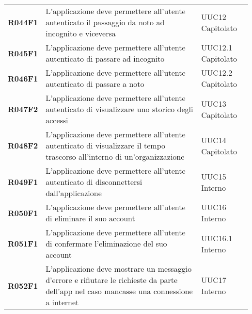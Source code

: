 \documentclass[../analisi-dei-requisiti.tex]{subfiles}
\begin{document}
\begin{longtable}[H]{>{\centering\bfseries}m{3cm} >{\centering}m{10cm} >{\centering\arraybackslash}m{3cm}}
  R044F1                               & L'applicazione deve permettere all'utente autenticato il passaggio da noto ad incognito e viceversa                                                                                                     & UUC12 Capitolato              \\
  R045F1                               & L'applicazione deve permettere all'utente autenticato di passare ad incognito                                                                                                                           & UUC12.1 Capitolato            \\
  R046F1                               & L'applicazione deve permettere all'utente autenticato di passare a noto                                                                                                                                 & UUC12.2 Capitolato            \\
  R047F2                               & L'applicazione deve permettere all'utente autenticato di visualizzare uno storico degli accessi                                                                                                         & UUC13 Capitolato              \\
  R048F2                               & L'applicazione deve permettere all'utente autenticato di visualizzare il tempo trascorso all'interno di un'organizzazione                                                                               & UUC14 Capitolato              \\
  R049F1                               & L'applicazione deve permettere all'utente autenticato di disconnettersi dall'applicazione                                                                                                               & UUC15 Interno                 \\
  R050F1                               & L'applicazione deve permettere all'utente di eliminare il suo account                                                                                                                                   & UUC16 Interno                 \\
  R051F1                               & L'applicazione deve permettere all'utente di confermare l'eliminazione del suo account                                                                                                                  & UUC16.1 Interno               \\
  R052F1                               & L'applicazione deve mostrare un messaggio d'errore e rifiutare le richieste da parte dell'app nel caso mancasse una connessione a internet                                                              & UUC17 Interno                 \\


\end{longtable}
\end{document}
